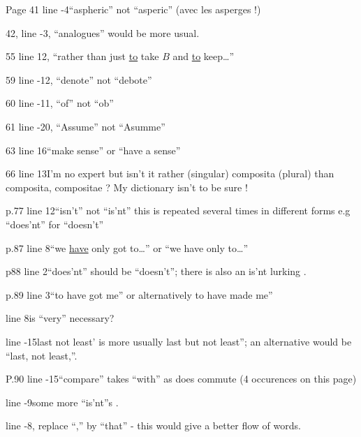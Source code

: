 Page 41 \unsure{-}line -4\quad ``aspheric'' not ``asperic'' (avec\unsure{,|-} les asperges !)

42, line -3, ``analogues'' would be more usual.

55 line 12, ``rather than just \uline{to} take $B$ and \uline{to} keep\ldots''

59 line -12, ``denote'' not ``debote''

60 line -11, ``of'' not ``ob''

61 line -20, ``Assume'' not ``Asumme''

63 line 16\quad ``make sense'' or ``have a sense''

66 line 13\quad I'm no  expert but isn't it rather  (singular) composita (plural) than composita, compositae ? My  dictionary isn't  to be sure !

p.77 line 12\quad ``isn't'' not ``is'nt'' this is repeated several times in different forms e.g ``does'nt'' for ``doesn't''

p.87 line 8\quad ``we \uline{have} only got to\ldots'' or ``we have only to\ldots''

p88 line 2\quad ``does'nt'' should be ``doesn't''; there is also an is'nt lurking .

p.89 line 3\quad ``to have got me'' or alternatively to have made me''

line 8\quad is ``very'' necessary?

line -15\quad {}last not least’ is more usually last but not least''; an alternative would be ``last, not least,''.

P.90 line -15\quad ``compare'' takes ``with'' as does commute (4 occurences on this page)

line -9\quad some more ``is'nt''s .

line -8, replace ``,'' by ``that'' - this would give a better flow of words.

